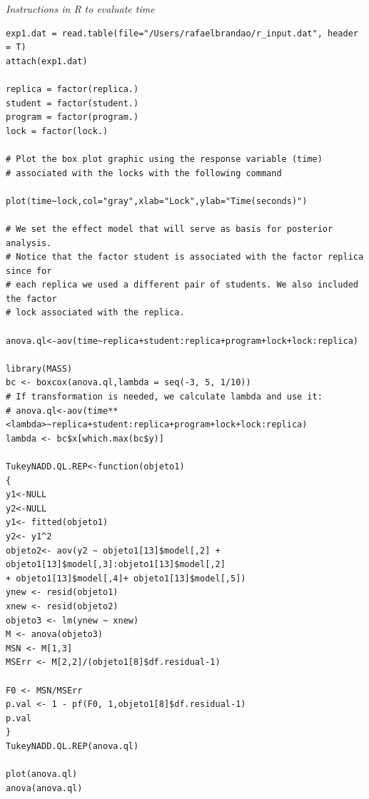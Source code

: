 \noindent
{\it Instructions in R to evaluate time}
\begin{verbatim}
exp1.dat = read.table(file="/Users/rafaelbrandao/r_input.dat", header = T)
attach(exp1.dat)

replica = factor(replica.)
student = factor(student.)
program = factor(program.)
lock = factor(lock.)

# Plot the box plot graphic using the response variable (time)
# associated with the locks with the following command

plot(time~lock,col="gray",xlab="Lock",ylab="Time(seconds)")

# We set the effect model that will serve as basis for posterior analysis.
# Notice that the factor student is associated with the factor replica since for
# each replica we used a different pair of students. We also included the factor
# lock associated with the replica.

anova.ql<-aov(time~replica+student:replica+program+lock+lock:replica)

library(MASS)
bc <- boxcox(anova.ql,lambda = seq(-3, 5, 1/10))
# If transformation is needed, we calculate lambda and use it:
# anova.ql<-aov(time**<lambda>~replica+student:replica+program+lock+lock:replica)
lambda <- bc$x[which.max(bc$y)]

TukeyNADD.QL.REP<-function(objeto1)
{
y1<-NULL
y2<-NULL
y1<- fitted(objeto1)
y2<- y1^2
objeto2<- aov(y2 ~ objeto1[13]$model[,2] +
objeto1[13]$model[,3]:objeto1[13]$model[,2]
+ objeto1[13]$model[,4]+ objeto1[13]$model[,5])
ynew <- resid(objeto1)
xnew <- resid(objeto2)
objeto3 <- lm(ynew ~ xnew)
M <- anova(objeto3)
MSN <- M[1,3]
MSErr <- M[2,2]/(objeto1[8]$df.residual-1)

F0 <- MSN/MSErr
p.val <- 1 - pf(F0, 1,objeto1[8]$df.residual-1)
p.val
}
TukeyNADD.QL.REP(anova.ql)

plot(anova.ql)
anova(anova.ql)
\end{verbatim}

